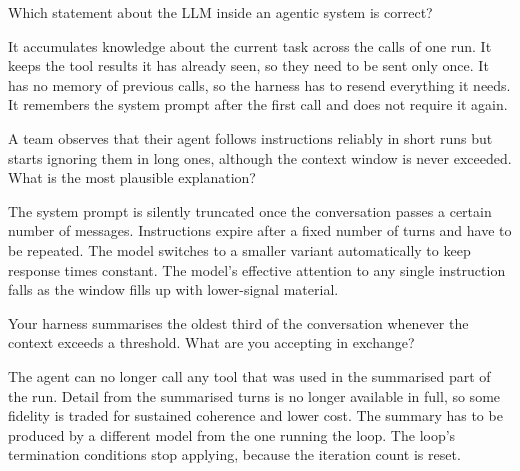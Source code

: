 \begin{questions}


\qitem Which statement about the LLM inside an agentic system is correct?
\begin{choices}
  \choice It accumulates knowledge about the current task across the calls of one run.
  \choice It keeps the tool results it has already seen, so they need to be sent only once.
  \CorrectChoice It has no memory of previous calls, so the harness has to resend everything it needs.
  \choice It remembers the system prompt after the first call and does not require it again.
\end{choices}
\dontknow
{}

\qitem A team observes that their agent follows instructions reliably in short runs but starts ignoring
them in long ones, although the context window is never exceeded. What is the most plausible explanation?
\begin{choices}
  \choice The system prompt is silently truncated once the conversation passes a certain number of messages.
  \choice Instructions expire after a fixed number of turns and have to be repeated.
  \choice The model switches to a smaller variant automatically to keep response times constant.
  \CorrectChoice The model's effective attention to any single instruction falls as the window fills up with lower-signal material.
\end{choices}
\dontknow
{}

\qitem Your harness summarises the oldest third of the conversation whenever the context exceeds a
threshold. What are you accepting in exchange?
\begin{choices}
  \choice The agent can no longer call any tool that was used in the summarised part of the run.
  \CorrectChoice Detail from the summarised turns is no longer available in full, so some fidelity is traded for sustained coherence and lower cost.
  \choice The summary has to be produced by a different model from the one running the loop.
  \choice The loop's termination conditions stop applying, because the iteration count is reset.
\end{choices}
\dontknow
{}


\end{questions}
